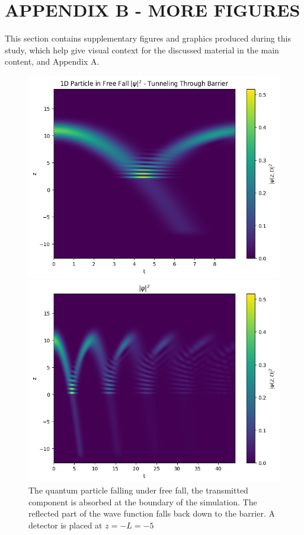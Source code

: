 \section{APPENDIX B - MORE FIGURES}

This section contains supplementary figures and graphics produced during this study, which help give visual context for the discussed material in the main content, and Appendix A.

\begin{figure}
    \centering
    \includegraphics[width=1\linewidth]{Figures//1d_arrival_time/single_bounce.png}

    \includegraphics[width=1\linewidth]{Figures//1d_arrival_time/many_bounces.png}
    
    \caption{The quantum particle falling under free fall, the transmitted component is absorbed at the boundary of the simulation. The reflected part of the wave function falls back down to the barrier. A detector is placed at $z=-L=-5$}
    \label{fig:single_bounce}
\end{figure}

